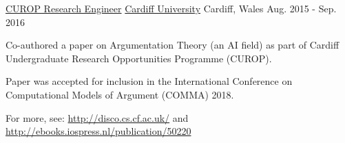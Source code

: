 \begin{cventries}
  \cventry
    {\href{https://www.cardiff.ac.uk/study/undergraduate/why-study-with-us/leaders-in-research/research-opportunities}{CUROP Research Engineer}} %
    {\href{https://www.cardiff.ac.uk/}{Cardiff University}} %
    {Cardiff, Wales} %
    {Aug. 2015 - Sep. 2016} %
    {
      \begin{cvitems} %
        \item Co-authored a paper on Argumentation Theory (an AI field) as part of Cardiff Undergraduate Research Opportunities Programme (CUROP).
        \item Paper was accepted for inclusion in the International Conference on Computational Models of Argument (COMMA) 2018.
        \item For more, see: \url{http://disco.cs.cf.ac.uk/} and \url{http://ebooks.iospress.nl/publication/50220}
      \end{cvitems}
    }
    {}

\end{cventries}
